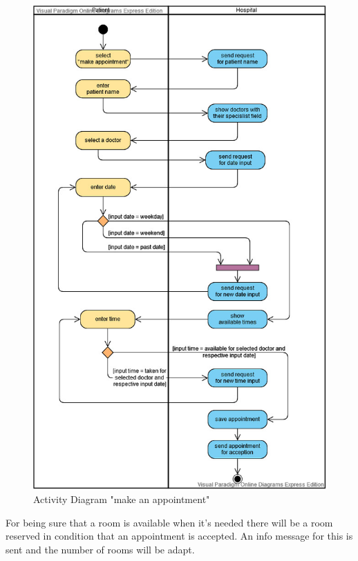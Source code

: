 \begin{figure}
\centering
\sidecaption
\includegraphics[scale=.55]{images/melanie_images/MakeAppointment.jpg}
\caption{Activity Diagram "make an appointment"}
\label{Make_Appointment}
\end{figure}

For being sure that a room is available when it's needed there will be a room reserved in condition that an appointment is accepted. An info message for this is sent and the number of rooms will be adapt. %



